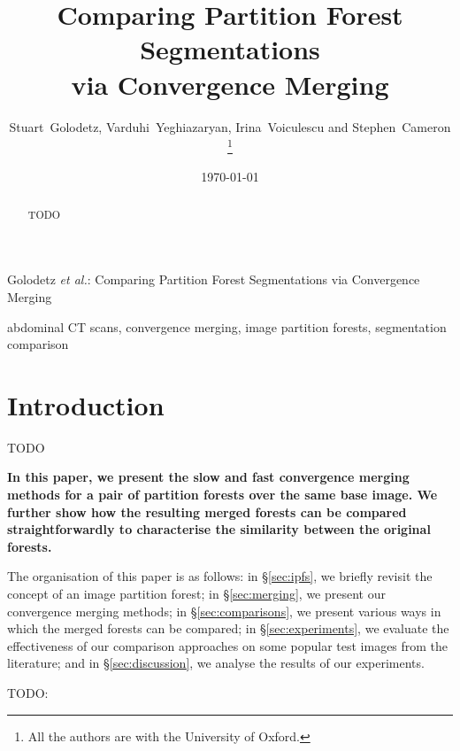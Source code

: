\documentclass[10pt,twocolumn,twoside]{IEEEtran}
\begin{document}
\title{Comparing Partition Forest Segmentations \\ via Convergence Merging}

\author{Stuart~Golodetz, Varduhi~Yeghiazaryan, Irina~Voiculescu and Stephen~Cameron%
\thanks{All the authors are with the University of Oxford.}}

\date{\today}

%
{Golodetz \MakeLowercase{\textit{et al.}}: Comparing Partition Forest Segmentations via Convergence Merging}


\maketitle

\begin{abstract}
\noindent TODO
\end{abstract}

\begin{IEEEkeywords}
abdominal CT scans, convergence merging, image partition forests, segmentation comparison
\end{IEEEkeywords}

\IEEEpeerreviewmaketitle

\section{Introduction}

TODO

\textbf{In this paper, we present the slow and fast convergence merging methods for a pair of partition forests over the same base image. We further show how the resulting merged forests can be compared straightforwardly to characterise the similarity between the original forests.}

The organisation of this paper is as follows: in \S\ref{sec:ipfs}, we briefly revisit the concept of an image partition forest; in \S\ref{sec:merging}, we present our convergence merging methods; in \S\ref{sec:comparisons}, we present various ways in which the merged forests can be compared; in \S\ref{sec:experiments}, we evaluate the effectiveness of our comparison approaches on some popular test images from the literature; and in \S\ref{sec:discussion}, we analyse the results of our experiments.

TODO: \cite{golodetz11}
\end{document}
